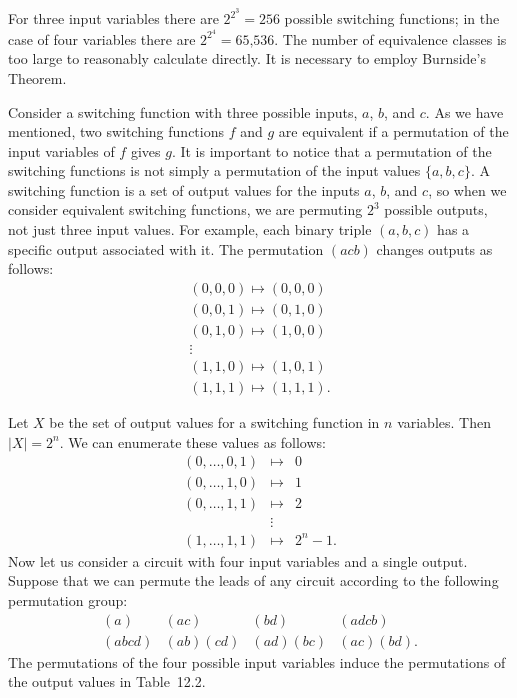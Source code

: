  
For three input variables there are $2^{2^3}=256$ possible switching
functions; in the case of four variables there are $2^{2^4} =
\mbox{65,536}$. The number of equivalence classes is too large to reasonably
calculate directly. It is necessary to employ  Burnside's Theorem.
 
 
Consider a  switching function with three possible inputs, $a$, $b$,
and $c$. As we have mentioned, two switching functions $f$ and $g$ are
equivalent if a permutation of the input variables of $f$ gives $g$.
It is important to notice that a permutation of the switching
functions is not simply a permutation of the input values $\{a, b,
c\}$. A switching function is a set of output values for the inputs
$a$, $b$, and $c$, so when we consider equivalent switching functions, we
are permuting $2^3$ possible outputs, not just three input values. For
example, each binary triple $(a, b, c)$ has a specific output
associated with it. The  permutation $(acb)$ changes outputs as follows: 
$$
\begin{array}{c}
(0, 0, 0) \mapsto (0, 0, 0) \\
(0, 0, 1) \mapsto (0, 1, 0) \\
(0, 1, 0) \mapsto (1, 0, 0) \\
\vdots \\
(1, 1, 0) \mapsto (1, 0, 1) \\
(1, 1, 1) \mapsto (1, 1, 1).
\end{array}
$$
 
 
Let $X$ be the set of output values for a switching function in $n$
variables. Then $|X|=2^n$. We can enumerate these values as follows: 
\begin{eqnarray*}
(0, \ldots, 0, 1) & \mapsto & 0 \\
(0, \ldots, 1, 0) & \mapsto & 1 \\
(0, \ldots, 1, 1) & \mapsto & 2 \\
& \vdots & \\
(1, \ldots, 1, 1) & \mapsto & 2^n-1.
\end{eqnarray*}
Now let us consider a circuit with four input variables and a single
output. Suppose that we can permute the leads  of any circuit
according to the following permutation group: 
$$
\begin{array}{cccc}
(a)    & (ac)     & (bd)     & (adcb) \\
(abcd) & (ab)(cd) & (ad)(bc) & (ac)(bd).
\end{array}
$$
The permutations of the four possible input variables induce the
permutations of the output values in Table~12.2. 
 

